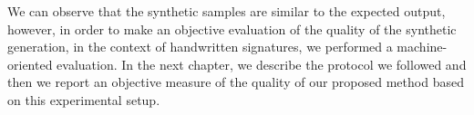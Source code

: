 We can observe that the synthetic samples are similar to the expected output, however, in order to make an objective evaluation of the quality of the synthetic generation, in the context of handwritten signatures, we performed a machine-oriented evaluation. In the next chapter, we describe the protocol we followed and then we report an objective measure of the quality of our proposed method based on this experimental setup.
